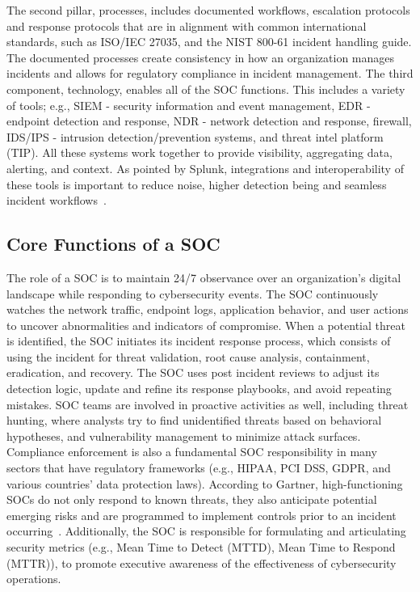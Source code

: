 The second pillar, processes, includes documented workflows, escalation protocols and response protocols that are in alignment with common international standards, such as ISO/IEC 27035, and the NIST 800-61 incident handling guide. The documented processes create consistency in how an organization manages incidents and allows for regulatory compliance in incident management. 
The third component, technology, enables all of the SOC functions. This includes a variety of tools; e.g., SIEM - security information and event management, EDR - endpoint detection and response, NDR - network detection and response, firewall, IDS/IPS - intrusion detection/prevention systems, and threat intel platform (TIP). All these systems work together to provide visibility, aggregating data, alerting, and context. As pointed by Splunk, integrations and interoperability of these tools is important to reduce noise, higher detection being and seamless incident workflows~\cite{splunk}.

\subsection{Core Functions of a SOC}\vspace{-0.5em}

The role of a SOC is to maintain 24/7 observance over an organization’s digital landscape while responding to cybersecurity events. The SOC continuously watches the network traffic, endpoint logs, application behavior, and user actions to uncover abnormalities and indicators of compromise. When a potential threat is identified, the SOC initiates its incident response process, which consists of using the incident for threat validation, root cause analysis, containment, eradication, and recovery. The SOC uses post incident reviews to adjust its detection logic, update and refine its response playbooks, and avoid repeating mistakes. SOC teams are involved in proactive activities as well, including threat hunting, where analysts try to find unidentified threats based on behavioral hypotheses, and vulnerability management to minimize attack surfaces. Compliance enforcement is also a fundamental SOC responsibility in many sectors that have regulatory frameworks (e.g., HIPAA, PCI DSS, GDPR, and various countries' data protection laws). According to Gartner, high-functioning SOCs do not only respond to known threats, they also anticipate potential emerging risks and are programmed to implement controls prior to an incident occurring~\cite{gartner}. Additionally, the SOC is responsible for formulating and articulating security metrics (e.g., Mean Time to Detect (MTTD), Mean Time to Respond (MTTR)), to promote executive awareness of the effectiveness of cybersecurity operations.

